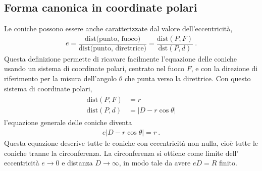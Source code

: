 \documentclass[letterpaper,10pt,english]{jupyterBook}
\begin{document}
\subsection{Forma canonica in coordinate polari}
\label{\detokenize{ch/analytic_geometry/analytic_geometry_2d/conics-polar:forma-canonica-in-coordinate-polari}}\label{\detokenize{ch/analytic_geometry/analytic_geometry_2d/conics-polar:geometry-analytic-2d-conics-polar}}\label{\detokenize{ch/analytic_geometry/analytic_geometry_2d/conics-polar::doc}}
\sphinxAtStartPar
Le coniche possono essere anche caratterizzate dal valore dell’eccentricità,
\begin{equation*}
\begin{split}e = \dfrac{\text{dist(punto, fuoco)}}{\text{dist(punto, direttrice)}} = \dfrac{\text{dist}(P,F)}{\text{dst}(P,d)} \ .\end{split}
\end{equation*}
\sphinxAtStartPar
Questa definizione permette di ricavare facilmente l’equazione delle coniche usando un sistema di coordinate polari, centrato nel fuoco \(F\), e con la direzione di riferimento per la misura dell’angolo \(\theta\) che punta verso la direttrice. Con questo sistema di coordinate polari,
\begin{equation*}
\begin{split}\begin{aligned}
  \text{dist}(P,F) & = r \\
  \text{dist}(P,d) & = | D - r \cos \theta |
\end{aligned}\end{split}
\end{equation*}
\sphinxAtStartPar
l’equazione generale delle coniche diventa
\begin{equation*}
\begin{split}e \big| D - r \cos \theta \big| = r \ .\end{split}
\end{equation*}
\sphinxAtStartPar
Questa equazione descrive tutte le coniche con eccentricità non nulla, cioè tutte le coniche tranne la circonferenza. La circonferenza si ottiene come limite dell’ eccentricità \(e \rightarrow 0\) e distanza \(D \rightarrow \infty\), in modo tale da avere \(e D = R\) finito.



\sphinxstepscope
\end{document}
